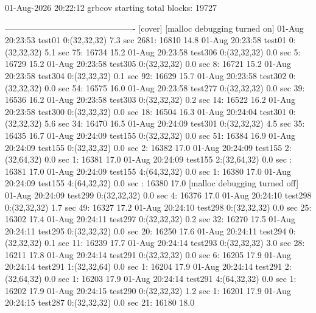 01-Aug-2026 20:22:12 grbcov starting
total blocks: 19727

---------------------------------------------- [cover]
[malloc debugging turned on]
01-Aug 20:23:53 test01      0:(32,32,32)     7.3 sec 2681: 16810 14.8%
01-Aug 20:23:58 test01      0:(32,32,32)     5.1 sec   75: 16734 15.2%
01-Aug 20:23:58 test306     0:(32,32,32)     0.0 sec    5: 16729 15.2%
01-Aug 20:23:58 test305     0:(32,32,32)     0.0 sec    8: 16721 15.2%
01-Aug 20:23:58 test304     0:(32,32,32)     0.1 sec   92: 16629 15.7%
01-Aug 20:23:58 test302     0:(32,32,32)     0.0 sec   54: 16575 16.0%
01-Aug 20:23:58 test277     0:(32,32,32)     0.0 sec   39: 16536 16.2%
01-Aug 20:23:58 test303     0:(32,32,32)     0.2 sec   14: 16522 16.2%
01-Aug 20:23:58 test300     0:(32,32,32)     0.0 sec   18: 16504 16.3%
01-Aug 20:24:04 test301     0:(32,32,32)     5.6 sec   34: 16470 16.5%
01-Aug 20:24:09 test301     0:(32,32,32)     4.5 sec   35: 16435 16.7%
01-Aug 20:24:09 test155     0:(32,32,32)     0.0 sec   51: 16384 16.9%
01-Aug 20:24:09 test155     0:(32,32,32)     0.0 sec    2: 16382 17.0%
01-Aug 20:24:09 test155     2:(32,64,32)     0.0 sec    1: 16381 17.0%
01-Aug 20:24:09 test155     2:(32,64,32)     0.0 sec     : 16381 17.0%
01-Aug 20:24:09 test155     4:(64,32,32)     0.0 sec    1: 16380 17.0%
01-Aug 20:24:09 test155     4:(64,32,32)     0.0 sec     : 16380 17.0%
[malloc debugging turned off]
01-Aug 20:24:09 test299     0:(32,32,32)     0.0 sec    4: 16376 17.0%
01-Aug 20:24:10 test298     0:(32,32,32)     1.7 sec   49: 16327 17.2%
01-Aug 20:24:10 test298     0:(32,32,32)     0.0 sec   25: 16302 17.4%
01-Aug 20:24:11 test297     0:(32,32,32)     0.2 sec   32: 16270 17.5%
01-Aug 20:24:11 test295     0:(32,32,32)     0.0 sec   20: 16250 17.6%
01-Aug 20:24:11 test294     0:(32,32,32)     0.1 sec   11: 16239 17.7%
01-Aug 20:24:14 test293     0:(32,32,32)     3.0 sec   28: 16211 17.8%
01-Aug 20:24:14 test291     0:(32,32,32)     0.0 sec    6: 16205 17.9%
01-Aug 20:24:14 test291     1:(32,32,64)     0.0 sec    1: 16204 17.9%
01-Aug 20:24:14 test291     2:(32,64,32)     0.0 sec    1: 16203 17.9%
01-Aug 20:24:14 test291     4:(64,32,32)     0.0 sec    1: 16202 17.9%
01-Aug 20:24:15 test290     0:(32,32,32)     1.2 sec    1: 16201 17.9%
01-Aug 20:24:15 test287     0:(32,32,32)     0.0 sec   21: 16180 18.0%
